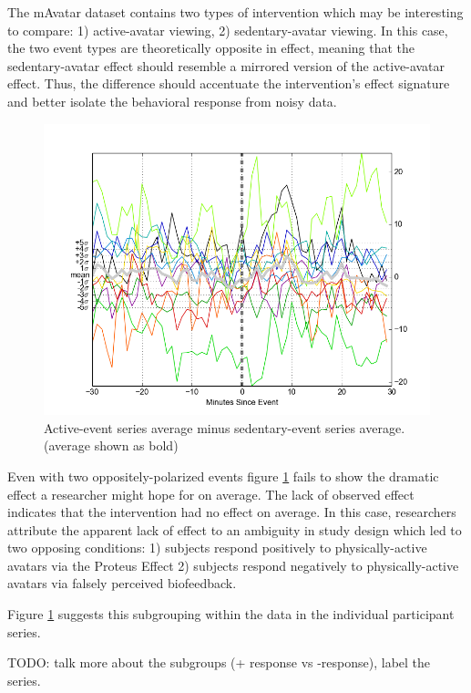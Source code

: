 The mAvatar dataset contains two types of intervention which may be interesting to compare: 1) active-avatar viewing, 2) sedentary-avatar viewing.
In this case, the two event types are theoretically opposite in effect, meaning that the sedentary-avatar effect should resemble a mirrored version of the active-avatar effect.
Thus, the difference should accentuate the intervention's effect signature and better isolate the behavioral response from noisy data.

\begin{figure}
\centering
\includegraphics[width=0.9\columnwidth]{./img/mAvatar_difference_events.png}
\caption{Active-event series average minus sedentary-event series average. (average shown as bold)}
\label{fig:mAvatarDifference}
\end{figure}

Even with two oppositely-polarized events figure \ref{fig:mAvatarDifference} fails to show the dramatic effect a researcher might hope for on average.
The lack of observed effect indicates that the intervention had no effect on average.
In this case, researchers attribute the apparent lack of effect to an ambiguity in study design which led to two opposing conditions: 1) subjects respond positively to physically-active avatars via the Proteus Effect \cite{yee2009proteus} 2) subjects respond negatively to physically-active avatars via falsely perceived biofeedback.

Figure \ref{fig:mAvatarDifference} suggests this subgrouping within the data in the individual participant series.

TODO: talk more about the subgroups (+ response vs -response), label the series.

